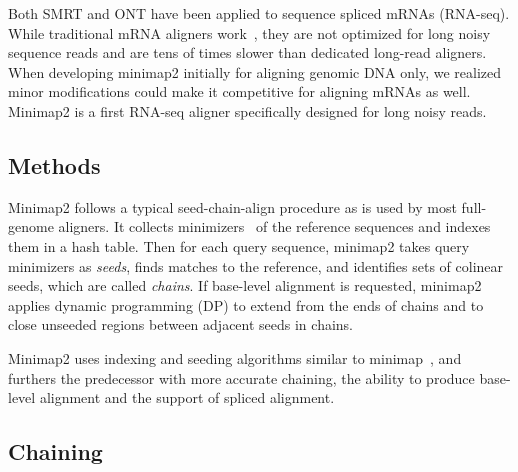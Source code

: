 \documentclass{bioinfo}
\begin{document}
Both SMRT and ONT have been applied to sequence spliced mRNAs (RNA-seq). While
traditional mRNA aligners work~\citep{Wu:2005vn,Iwata:2012aa}, they are not
optimized for long noisy sequence reads and are tens of times slower than
dedicated long-read aligners. When developing minimap2 initially for aligning
genomic DNA only, we realized minor modifications could make it competitive for
aligning mRNAs as well. Minimap2 is a first RNA-seq aligner specifically
designed for long noisy reads.

\begin{methods}
\section{Methods}

Minimap2 follows a typical seed-chain-align procedure as is used by most
full-genome aligners. It collects minimizers~\citep{Roberts:2004fv} of the
reference sequences and indexes them in a hash table. Then for each query
sequence, minimap2 takes query minimizers as \emph{seeds}, finds matches to the
reference, and identifies sets of colinear seeds, which are called
\emph{chains}. If base-level alignment is requested, minimap2 applies dynamic
programming (DP) to extend from the ends of chains and to close unseeded
regions between adjacent seeds in chains.

Minimap2 uses indexing and seeding algorithms similar to
minimap~\citep{Li:2016aa}, and furthers the predecessor with more accurate
chaining, the ability to produce base-level alignment and the support of
spliced alignment.

\subsection{Chaining}


\end{methods}
\end{document}
